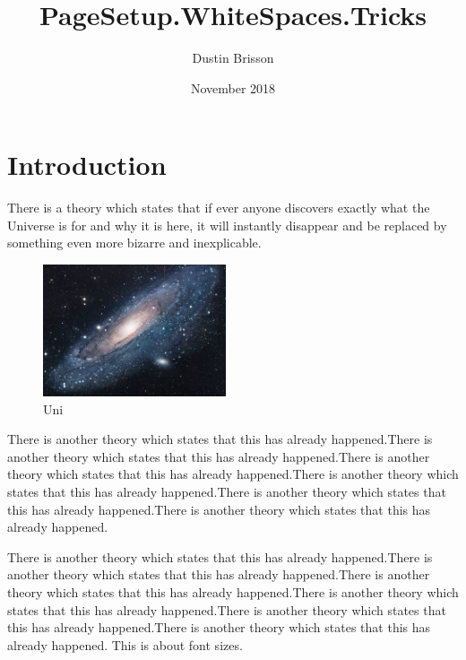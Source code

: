 \documentclass[letterpaper,12pt]{article}%
\title{PageSetup.WhiteSpaces.Tricks}
\author{Dustin Brisson}
\date{November 2018}
\begin{document}
\maketitle

\section{Introduction}
\vspace{1pt}%
There is a theory which states that if ever anyone discovers exactly what the Universe is for and why it is here, it will instantly disappear and be replaced by something even more bizarre and inexplicable.

\begin{figure}
  \begin{center}
    \includegraphics[width=0.48\textwidth]{universe.jpg}
  \end{center}
  \caption{Uni}
\end{figure}

\begin{spacing}{2} %
There is another theory which states that this has already happened.There is another theory which states that this has already happened.There is another theory which states that this has already happened.There is another theory which states that this has already happened.There is another theory which states that this has already happened.There is another theory which states that this has already happened.
\end{spacing}

\vspace{1cm} %
There is another theory which states that this has already happened.There is another theory which states that this has already happened.There is another theory which states that this has already happened.There is another theory which states that this has already happened.There is another theory which states that this has already happened.There is another theory which states that this has already happened.
\vspace{1in}%
This is about font sizes. 
\end{document}

